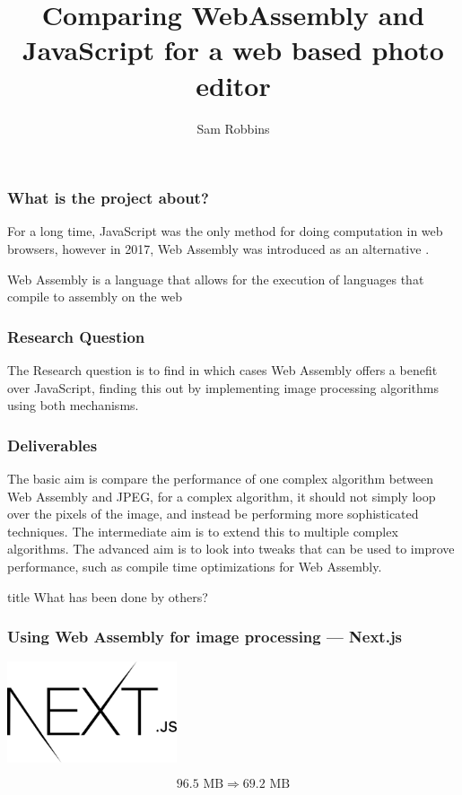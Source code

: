 \documentclass{beamer}
\title{Comparing WebAssembly and JavaScript for a web based photo editor}
\author{Sam Robbins}
\institute{Durham University}
\date{}
\begin{document}
\frame{\titlepage}

\begin{frame}
    \frametitle{What is the project about?}

    For a long time, JavaScript was the only method for doing computation in web browsers, however in 2017, Web Assembly was introduced as an alternative \cite{haas2017bringing}.

    \begin{definition}
        Web Assembly is a language that allows for the execution of languages that compile to assembly on the web
    \end{definition}




\end{frame}

\begin{frame}
    \frametitle{Research Question}
    The Research question is to find in which cases Web Assembly offers a benefit over JavaScript, finding this out by implementing image processing algorithms using both mechanisms.
\end{frame}

\begin{frame}
    \frametitle{Deliverables}
    The basic aim is compare the performance of one complex algorithm between Web Assembly and JPEG, for a complex algorithm, it should not simply loop over the pixels of the image, and instead be performing more sophisticated techniques. The intermediate aim is to extend this to multiple complex algorithms. The advanced aim is to look into tweaks that can be used to improve performance, such as compile time optimizations for Web Assembly.
\end{frame}

\begin{frame}
    \vfill
    \centering
    \begin{beamercolorbox}[sep=8pt,center,shadow=true,rounded=true]{title}
         What has been done by others?\par%
    \end{beamercolorbox}
    \vfill
\end{frame}

\begin{frame}
    \frametitle{Using Web Assembly for image processing — Next.js}
    \begin{center}
        \includegraphics[width=5cm]{nextjs.png}

    \end{center}

    $$
        96.5 \text{ MB} \Rightarrow 69.2 \text{ MB}
    $$
\end{frame}
\end{document}
